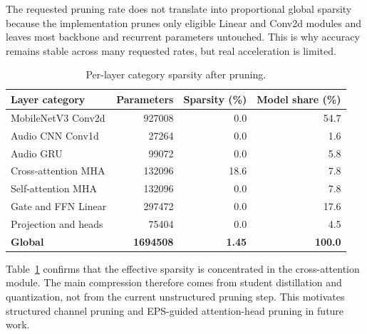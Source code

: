 \documentclass[pdflatex,sn-basic,Numbered]{sn-jnl}
\begin{document}
The requested pruning rate does not translate into proportional global sparsity because the implementation prunes only eligible Linear and Conv2d modules and leaves most backbone and recurrent parameters untouched. This is why accuracy remains stable across many requested rates, but real acceleration is limited.

\begin{table}[t]
\caption{Per-layer category sparsity after pruning.}\label{tab:sparsity}
\centering
\scriptsize
\setlength{\tabcolsep}{4pt}
\begin{tabular}{p{}rrr}
\toprule
Layer category & Parameters & Sparsity (\%) & Model share (\%) \\
\midrule
MobileNetV3 Conv2d & 927008 & 0.0 & 54.7 \\
Audio CNN Conv1d & 27264 & 0.0 & 1.6 \\
Audio GRU & 99072 & 0.0 & 5.8 \\
Cross-attention MHA & 132096 & 18.6 & 7.8 \\
Self-attention MHA & 132096 & 0.0 & 7.8 \\
Gate and FFN Linear & 297472 & 0.0 & 17.6 \\
Projection and heads & 75404 & 0.0 & 4.5 \\
\textbf{Global} & \textbf{1694508} & \textbf{1.45} & \textbf{100.0} \\
\bottomrule
\end{tabular}
\end{table}

Table~\ref{tab:sparsity} confirms that the effective sparsity is concentrated in the cross-attention module. The main compression therefore comes from student distillation and quantization, not from the current unstructured pruning step. This motivates structured channel pruning and EPS-guided attention-head pruning in future work.
\end{document}
